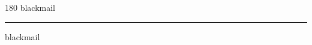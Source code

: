 
\begin{frame}
\begin{center}
\begin{turn}{180}
{\fontsize{2.5cm}{1em}\selectfont blackmail}
\end{turn}
\vspace{1em}\par  
\hrule
\vspace{1em}\par  
{\fontsize{2.5cm}{1em}\selectfont blackmail}
\end{center}
\end{frame}
